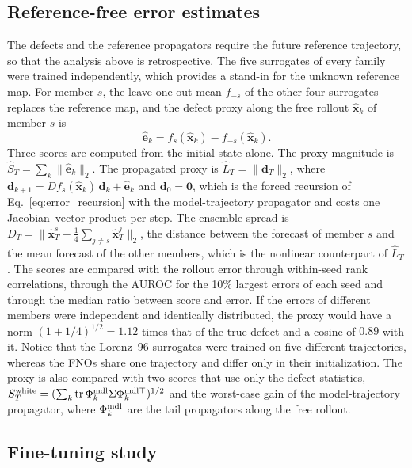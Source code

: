 \subsection{Reference-free error estimates}
\label{sec:design_ensemble}

The defects and the reference propagators require the future reference trajectory, so that the analysis above is retrospective. The five surrogates of every family were trained independently, which provides a stand-in for the unknown reference map. For member $s$, the leave-one-out mean $\bar f_{-s}$ of the other four surrogates replaces the reference map, and the defect proxy along the free rollout $\hat{\mathbf x}_k$ of member $s$ is
\begin{equation}
  \hat{\mathbf e}_k=f_s(\hat{\mathbf x}_k)-\bar f_{-s}(\hat{\mathbf x}_k).
  \label{eq:proxy}
\end{equation}
Three scores are computed from the initial state alone. The proxy magnitude is $\hat S_T=\sum_k\|\hat{\mathbf e}_k\|_2$. The propagated proxy is $\hat L_T=\|\mathbf d_T\|_2$, where $\mathbf d_{k+1}=Df_s(\hat{\mathbf x}_k)\,\mathbf d_k+\hat{\mathbf e}_k$ and $\mathbf d_0=\mathbf 0$, which is the forced recursion of Eq.~\eqref{eq:error_recursion} with the model-trajectory propagator and costs one Jacobian--vector product per step. The ensemble spread is $D_T=\|\hat{\mathbf x}^s_T-\frac14\sum_{j\ne s}\hat{\mathbf x}^j_T\|_2$, the distance between the forecast of member $s$ and the mean forecast of the other members, which is the nonlinear counterpart of $\hat L_T$. The scores are compared with the rollout error through within-seed rank correlations, through the AUROC for the 10\% largest errors of each seed and through the median ratio between score and error. If the errors of different members were independent and identically distributed, the proxy would have a norm $(1+1/4)^{1/2}=1.12$ times that of the true defect and a cosine of $0.89$ with it. Notice that the Lorenz--96 surrogates were trained on five different trajectories, whereas the FNOs share one trajectory and differ only in their initialization. The proxy is also compared with two scores that use only the defect statistics, $S^{\rm white}_T=(\sum_k\operatorname{tr}\Phi^{\rm mdl}_k\Sigma\Phi^{\rm mdl\top}_k)^{1/2}$ and the worst-case gain of the model-trajectory propagator, where $\Phi^{\rm mdl}_k$ are the tail propagators along the free rollout.

\subsection{Fine-tuning study}
\label{sec:design_intervention}

